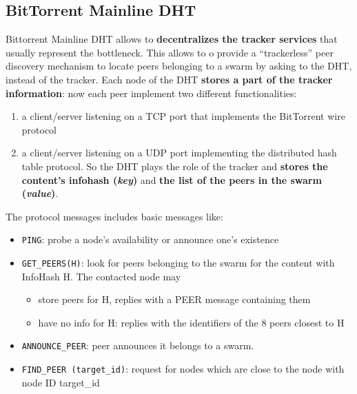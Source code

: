 \documentclass[10pt,a4paper]{report}
\begin{document}
\subsection{BitTorrent Mainline DHT}\label{sec:bittorrent-mainline-dht}
Bittorrent Mainline DHT allows to \textbf{decentralizes the tracker services} that usually represent the bottleneck. This allows to o provide a “trackerless” peer discovery mechanism to locate peers belonging to a swarm by asking to the DHT, instead of the tracker.
Each node of the DHT \textbf{stores a part of the tracker information}: now each peer implement two different functionalities:
\begin{enumerate}
	\item 
	a client/server listening on a TCP port that implements the BitTorrent wire protocol
	\item 
	a client/server listening on a UDP port implementing the distributed hash table protocol.
	So the DHT plays the role of the tracker and \textbf{stores the content's infohash (\textit{key})} and \textbf{the list of the peers in the swarm (\textit{value})}.
\end{enumerate}
The protocol messages includes basic messages like:
\begin{itemize}
	\item 
	\texttt{PING}: probe a node’s availability or announce one's existence
	\item 
	\texttt{GET\_PEERS(H)}: look for peers belonging to the swarm for the content with InfoHash H. The contacted node may
	\begin{itemize}
		\item 
		store peers for H, replies with a PEER message containing them
		\item 
		have no info for H: replies with the identifiers of the 8 peers closest to H
	\end{itemize}
	\item 
	\texttt{ANNOUNCE\_PEER}: peer announces it belongs to a swarm.
	\item 
	\texttt{FIND\_PEER (target\_id)}: request for nodes which are close to the node with node ID target\_id
\end{itemize}
\end{document}
